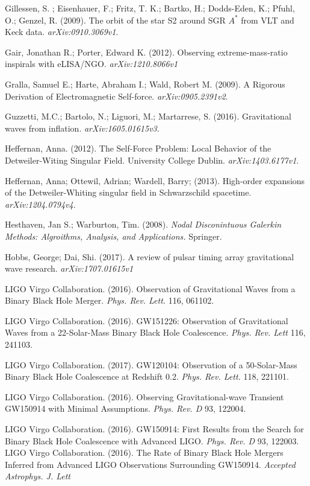 Gillessen, S. ; Eisenhauer, F.; Fritz, T. K.; Bartko, H.; Dodds-Eden, K.; Pfuhl, O.; Genzel, R. (2009). The orbit of the star S2 around SGR $A^*$ from VLT and Keck data. {\em arXiv:0910.3069v1}.



Gair, Jonathan R.; Porter, Edward K. (2012). Observing extreme-mass-ratio inspirals with eLISA/NGO. {\em arXiv:1210.8066v1}

Gralla, Samuel E.; Harte, Abraham I.; Wald, Robert M. (2009). A Rigorous Derivation of Electromagnetic Self-force. {\em arXiv:0905.2391v2}.

Guzzetti, M.C.; Bartolo, N.; Liguori, M.; Martarrese, S. (2016). Gravitational waves from inflation. {\em arXiv:1605.01615v3}.

Heffernan, Anna. (2012). The Self-Force Problem: Local Behavior of the Detweiler-Witing Singular Field. University College Dublin. {\em arXiv:1403.6177v1}.

Heffernan, Anna; Ottewil, Adrian; Wardell, Barry; (2013). High-order expansions of the Detweiler-Whiting singular field in Schwarzschild spacetime. {\em arXiv:1204.0794v4}.

Hesthaven, Jan S.; Warburton, Tim. (2008). {\em Nodal Disconintuous Galerkin Methods: Algroithms, Analysis, and Applications.} Springer.

Hobbs, George; Dai, Shi. (2017). A review of pulsar timing array gravitational wave research. {\em arXiv:1707.01615v1}

LIGO Virgo Collaboration. (2016). Observation of Gravitational Waves from a Binary Black Hole Merger. {\em Phys. Rev. Lett.} 116, 061102.

LIGO Virgo Collaboration. (2016). GW151226: Observation of Gravitational Waves from a 22-Solar-Mass Binary Black Hole Coalescence. {\em Phys. Rev. Lett} 116, 241103.
  
LIGO Virgo Collaboration. (2017). GW120104: Observation of a 50-Solar-Mass Binary Black Hole Coalescence at Redshift 0.2. {\em Phys. Rev. Lett.} 118, 221101.

LIGO Virgo Collaboration. (2016). Observing Gravitational-wave Transient GW150914 with Minimal Assumptions. {\em Phys. Rev. D} 93, 122004.

LIGO Virgo Collaboration. (2016). GW150914: First Results from the Search for Binary Black Hole Coalescence with Advanced LIGO. {\em Phys. Rev. D} 93, 122003.
LIGO Virgo Collaboration. (2016). The Rate of Binary Black Hole Mergers Inferred from Advanced LIGO Observations Surrounding GW150914. {\em Accepted Astrophys. J. Lett}

